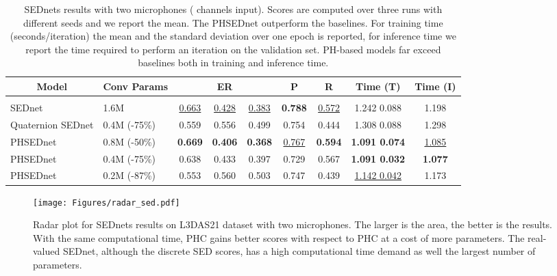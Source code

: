 \documentclass[lettersize,journal]{IEEEtran}
\begin{document}
\begin{table*}[t]
\caption{SEDnets results with two microphones ( channels input). Scores are computed over three runs with different seeds and we report the mean. The PHSEDnet  outperform the baselines. For training time (seconds/iteration) the mean and the standard deviation over one epoch is reported, for inference time we report the time required to perform an iteration on the validation set. PH-based models far exceed baselines both in training and inference time.}
\label{tab:sed_8c}
\begin{center}
\begin{tabular}{llccccccc}
\multicolumn{1}{c}{\bf Model} &\multicolumn{1}{c}{\bf Conv Params} &\multicolumn{1}{c}{\bf \text{F\textsubscript{score}} } &\multicolumn{1}{c}{\bf ER } &\multicolumn{1}{c}{\bf \text{SED\textsubscript{score}} } &\multicolumn{1}{c}{\bf P } &\multicolumn{1}{c}{\bf R } &\multicolumn{1}{c}{\bf Time (T)} &\multicolumn{1}{c}{\bf Time (I)} \\
\hline \\

SEDnet         & 1.6M   & \underline{0.663} & \underline{0.428} & \underline{0.383} & \textbf{0.788} & \underline{0.572} & 1.242  0.088 & 1.198 \\
Quaternion SEDnet & 0.4M (-75\%) & 0.559 & 0.556 & 0.499 & 0.754 & 0.444 & 1.308  0.088 & 1.298 \\
PHSEDnet  & 0.8M (-50\%) & \textbf{0.669} & \textbf{0.406} & \textbf{0.368} & \underline{0.767} & \textbf{0.594} & \textbf{1.091  0.074} & \underline{1.085} \\
PHSEDnet  & 0.4M (-75\%) & 0.638 & 0.433 & 0.397 & 0.729 & 0.567 & \textbf{1.091  0.032} & \textbf{1.077} \\
PHSEDnet  &  0.2M (-87\%) & 0.553 & 0.560 & 0.503 & 0.747 & 0.439 & \underline{1.142  0.042} & 1.173 \\
\end{tabular}
\end{center}
\end{table*}

\begin{figure}[t]
    \centering
    \texttt{[image: Figures/radar\_sed.pdf]}
    \caption{Radar plot for SEDnets results on L3DAS21 dataset with two microphones. The larger is the area, the better is the results. With the same computational time, PHC  gains better scores with respect to PHC  at a cost of more parameters. The real-valued SEDnet, although the discrete SED scores, has a high computational time demand as well the largest number of parameters.}
    \label{fig:radar}
\end{figure}
\end{document}
